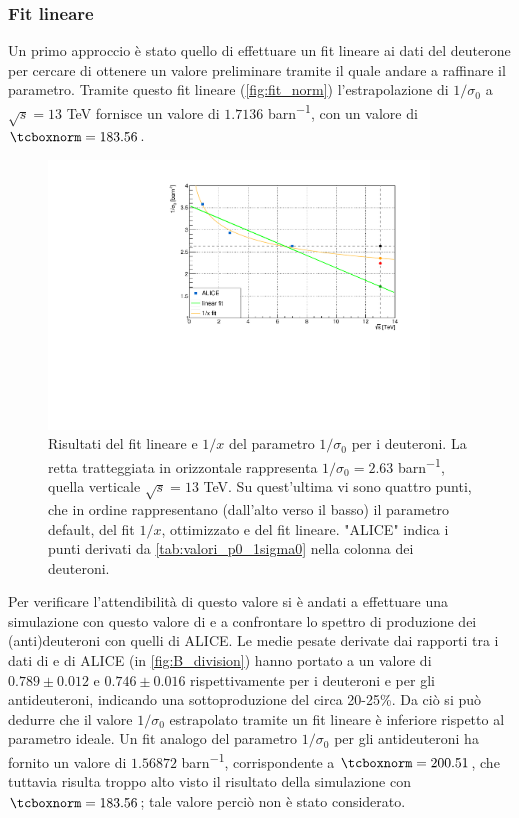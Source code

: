 \subsubsection{Fit lineare}
Un primo approccio è stato quello di effettuare un fit lineare ai dati del deuterone per cercare di ottenere un valore preliminare tramite il quale andare a raffinare il parametro.
Tramite questo fit lineare (\autoref{fig:fit_norm}) l'estrapolazione di $1/\sigma_0$ a $\sqrt{s} = 13$ TeV fornisce un valore di $1.7136$ \si{barn^{-1}}, con un valore di $\ttbox{norm} = 183.56$.
\begin{figure}[htb]
    \centering
    \includegraphics[width=0.9\textwidth]{image/canvas.pdf}
    \caption{Risultati del fit lineare e $1/x$ del parametro $1/\sigma_0$ per i deuteroni. La retta tratteggiata in orizzontale rappresenta $1/\sigma_0 = 2.63$ \si{barn^{-1}}, quella verticale $\sqrt s = 13$ TeV. Su quest'ultima vi sono quattro punti, che in ordine rappresentano (dall'alto verso il basso) il parametro default, del fit $1/x$, ottimizzato e del fit lineare.
    "ALICE" indica i punti derivati da \autoref{tab:valori_p0_1sigma0} nella colonna dei deuteroni.}
    \label{fig:fit_norm}
\end{figure}
Per verificare l'attendibilità di questo valore si è andati a effettuare una simulazione con questo valore di  e a confrontare lo spettro di produzione dei (anti)deuteroni con quelli di ALICE.
Le medie pesate derivate dai rapporti tra i dati di \pythiaa{} e di ALICE (in \autoref{fig:B_division}) hanno portato a un valore di $0.789 \pm 0.012$ e $0.746 \pm 0.016$ rispettivamente per i deuteroni e per gli antideuteroni, indicando una sottoproduzione del circa 20-25\%.
Da ciò si può dedurre che il valore $1/\sigma_0$ estrapolato tramite un fit lineare è inferiore rispetto al parametro ideale.
Un fit analogo del parametro $1/\sigma_0$ per gli antideuteroni ha fornito un valore di $1.56872$ \si{barn^{-1}}, corrispondente a $\ttbox{norm} = 200.51$, che tuttavia risulta troppo alto visto il risultato della simulazione con $\ttbox{norm} = 183.56$; tale valore perciò non è stato considerato.

